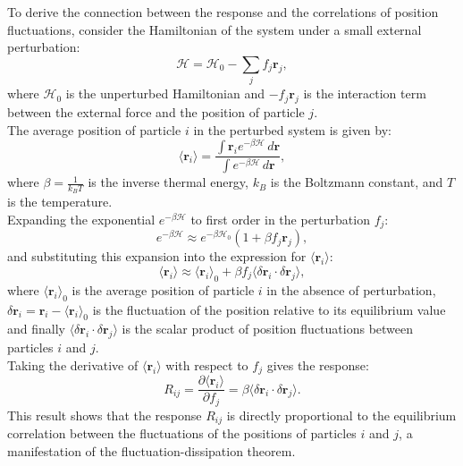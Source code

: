 \documentclass[English, Lau, oneside]{sapthesis}
\begin{document}
\noindent To derive the connection between the response and the correlations of position fluctuations, consider the Hamiltonian of the system under a small external perturbation:
\begin{equation}
\mathcal{H} = \mathcal{H}_0 - \sum_j f_j \mathbf{r}_j,
\end{equation}
where $\mathcal{H}_0$ is the unperturbed Hamiltonian and $-f_j \mathbf{r}_j$ is the interaction term between the external force and the position of particle $j$.\\
The average position of particle $i$ in the perturbed system is given by:
\begin{equation}
\langle \mathbf{r}_i \rangle = \frac{\int \mathbf{r}_i e^{-\beta \mathcal{H}} \, d\mathbf{r}}{\int e^{-\beta \mathcal{H}} \, d\mathbf{r}},
\end{equation}
where $\beta = \frac{1}{k_B T}$ is the inverse thermal energy, $k_B$ is the Boltzmann constant, and $T$ is the temperature.\\
Expanding the exponential $e^{-\beta \mathcal{H}}$ to first order in the perturbation $f_j$:
\begin{equation}
e^{-\beta \mathcal{H}} \approx e^{-\beta \mathcal{H}_0} \left( 1 + \beta f_j \mathbf{r}_j \right),
\end{equation}
and substituting this expansion into the expression for $\langle \mathbf{r}_i \rangle$:
\begin{equation}
\langle \mathbf{r}_i \rangle \approx \langle \mathbf{r}_i \rangle_0 + \beta f_j \langle \delta \mathbf{r}_i \cdot \delta \mathbf{r}_j \rangle,
\end{equation}
where $\langle \mathbf{r}_i \rangle_0$ is the average position of particle $i$ in the absence of perturbation, $\delta \mathbf{r}_i = \mathbf{r}_i - \langle \mathbf{r}_i \rangle_0$ is the fluctuation of the position relative to its equilibrium value and finally $\langle \delta \mathbf{r}_i \cdot \delta \mathbf{r}_j \rangle$ is the scalar product of position fluctuations between particles $i$ and $j$.\\
Taking the derivative of $\langle \mathbf{r}_i \rangle$ with respect to $f_j$ gives the response:
\begin{equation}
R_{ij} = \frac{\partial \langle \mathbf{r}_i \rangle}{\partial f_j} = \beta \langle \delta \mathbf{r}_i \cdot \delta \mathbf{r}_j \rangle. \label{response}
\end{equation}
This result shows that the response $R_{ij}$ is directly proportional to the equilibrium correlation between the fluctuations of the positions of particles $i$ and $j$, a manifestation of the fluctuation-dissipation theorem.
\end{document}
